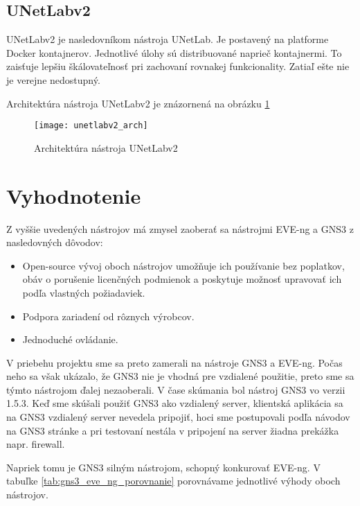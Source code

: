 \subsection{UNetLabv2}

UNetLabv2 je nasledovníkom nástroja UNetLab. Je postavený na platforme Docker kontajnerov. Jednotlivé úlohy sú distribuované naprieč kontajnermi. To zaisťuje lepšiu škálovateľnosť pri zachovaní rovnakej funkcionality. Zatiaľ ešte nie je verejne nedostupný.

Architektúra nástroja UNetLabv2 je znázornená na obrázku \ref{obr:unetlabv2_arch}

\begin{figure}
    \centering
    \texttt{[image: unetlabv2\_arch]}
    \caption{Architektúra nástroja UNetLabv2} \cite{obr_unetlabv2_arch}
    \label{obr:unetlabv2_arch}
\end{figure}

\section{Vyhodnotenie}

Z vyššie uvedených nástrojov má zmysel zaoberať sa nástrojmi EVE-ng a GNS3 z nasledovných dôvodov:
\begin{itemize}
    \item Open-source vývoj oboch nástrojov umožňuje ich používanie bez poplatkov, obáv o porušenie licenčných podmienok a poskytuje možnosť upravovať ich podľa vlastných požiadaviek.
    \item Podpora zariadení od rôznych výrobcov.
    \item Jednoduché ovládanie.
\end{itemize}

V priebehu projektu sme sa preto zamerali na nástroje GNS3 a EVE-ng. Počas neho sa však ukázalo, že GNS3 nie je vhodná pre vzdialené použitie, preto sme sa týmto nástrojom ďalej nezaoberali. V čase skúmania bol nástroj GNS3 vo verzii 1.5.3. Keď sme skúšali použiť GNS3 ako vzdialený server, klientská aplikácia sa na GNS3 vzdialený server nevedela pripojiť, hoci sme postupovali podľa návodov na GNS3 stránke a pri testovaní nestála v pripojení na server žiadna prekážka napr. firewall.

Napriek tomu je GNS3 silným nástrojom, schopný konkurovať EVE-ng. V tabuľke \ref{tab:gns3_eve_ng_porovnanie} porovnávame jednotlivé výhody oboch nástrojov.

